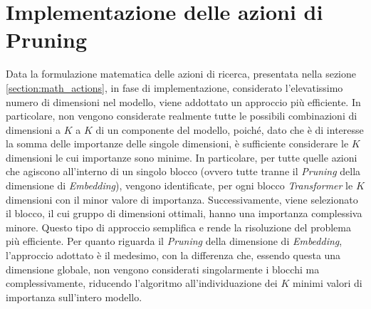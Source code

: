 \section{Implementazione delle azioni di Pruning}
\label{section:action_impl}
Data la formulazione matematica delle azioni di ricerca, presentata nella sezione \ref{section:math_actions}, in fase di implementazione, considerato l'elevatissimo numero di dimensioni nel modello, viene addottato un approccio più efficiente.
In particolare, non vengono considerate realmente tutte le possibili combinazioni di dimensioni a $K$ a $K$ di un componente del modello, poiché, dato che è di interesse la somma delle importanze delle singole dimensioni, è sufficiente considerare le $K$ dimensioni le cui importanze sono minime. In particolare, per tutte quelle azioni che agiscono all'interno di un singolo blocco (ovvero tutte tranne il \textit{Pruning} della dimensione di \textit{Embedding}), vengono identificate, per ogni blocco \textit{Transformer} le $K$ dimensioni con il minor valore di importanza. Successivamente, viene selezionato il blocco, il cui gruppo di dimensioni ottimali, hanno una importanza complessiva minore. Questo tipo di approccio semplifica e rende la risoluzione del problema più efficiente. \newline
Per quanto riguarda il \textit{Pruning} della dimensione di \textit{Embedding}, l'approccio adottato è il medesimo, con la differenza che, essendo questa una dimensione globale, non vengono considerati singolarmente i blocchi ma complessivamente, riducendo l'algoritmo all'individuazione dei $K$ minimi valori di importanza sull'intero modello. \newline
